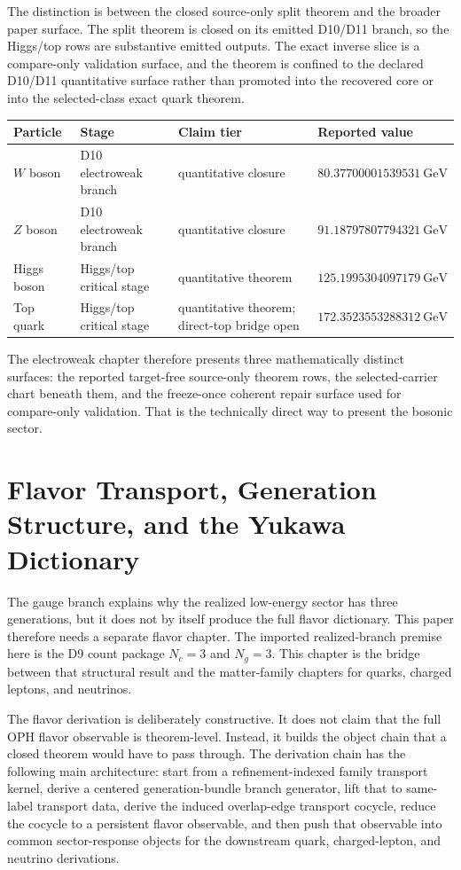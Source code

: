 \documentclass[11pt]{article}
\begin{document}
The distinction is between the closed source-only split theorem and the broader paper surface. The
split theorem is closed on its emitted D10/D11 branch, so the Higgs/top rows are
substantive emitted outputs. The exact inverse slice is a compare-only validation surface, and the theorem is confined to the declared D10/D11 quantitative surface rather than promoted into the recovered core or into the selected-class exact quark theorem.

\begin{table}[h]
\centering
\small
\begin{tabular}{@{}llll@{}}
\toprule
Particle & Stage & Claim tier & Reported value \\
\midrule
\(W\) boson & D10 electroweak branch & quantitative closure & \(80.37700001539531~\mathrm{GeV}\) \\
\(Z\) boson & D10 electroweak branch & quantitative closure & \(91.18797807794321~\mathrm{GeV}\) \\
Higgs boson & Higgs/top critical stage & quantitative theorem & \(125.1995304097179~\mathrm{GeV}\) \\
Top quark & Higgs/top critical stage & quantitative theorem; direct-top bridge open & \(172.3523553288312~\mathrm{GeV}\) \\
\bottomrule
\end{tabular}
\end{table}

The electroweak chapter therefore presents three mathematically distinct surfaces: the reported
target-free source-only theorem rows, the selected-carrier chart beneath them, and the freeze-once
coherent repair surface used for compare-only validation. That is the technically direct way to
present the bosonic sector.

\section{Flavor Transport, Generation Structure, and the Yukawa Dictionary}

The gauge branch explains why the realized low-energy sector has three generations, but it does
not by itself produce the full flavor dictionary. This paper therefore needs a
separate flavor chapter. The imported realized-branch premise here is the D9 count package
\(N_c=3\) and \(N_g=3\). This chapter is the bridge between that structural result and the
matter-family chapters for quarks, charged leptons, and neutrinos.

The flavor derivation is deliberately constructive. It does not claim that the full
OPH flavor observable is theorem-level. Instead, it builds the object chain that a
closed theorem would have to pass through. The derivation chain has the following main
architecture: start from a refinement-indexed family transport kernel, derive a centered
generation-bundle branch generator, lift that to same-label transport data, derive the induced
overlap-edge transport cocycle, reduce the cocycle to a persistent flavor observable, and then
push that observable into common sector-response objects for the downstream quark, charged-lepton,
and neutrino derivations.
\end{document}
